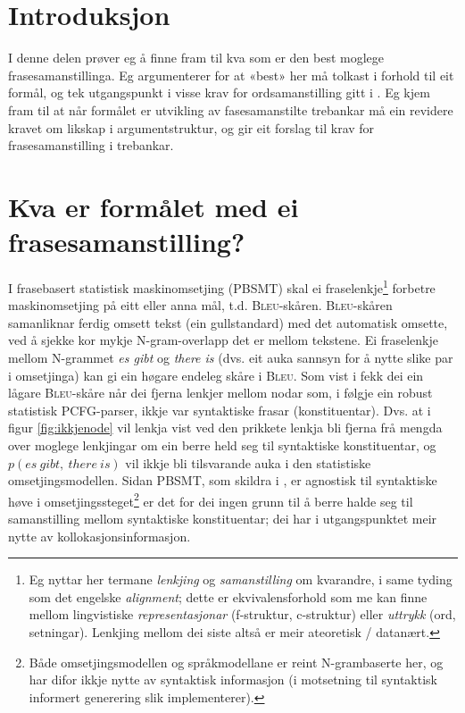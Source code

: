 \documentclass[11pt,a4paper,oneside,draft]{book}
\begin{document}
\section{Introduksjon}
\label{sec-3.2}

I denne delen prøver eg å finne fram til kva som er den best moglege
frasesamanstillinga. Eg argumenterer for at «best» her må tolkast i
forhold til eit formål, og tek utgangspunkt i visse krav for
ordsamanstilling gitt i \citet{thunes2003eal}. Eg kjem fram til at når
formålet er utvikling av fasesamanstilte trebankar må ein revidere
kravet om likskap i argumentstruktur, og gir eit forslag til krav for
frasesamanstilling i trebankar.

\section{Kva er formålet med ei frasesamanstilling?}
\label{sec-3.3}

I frasebasert statistisk maskinomsetjing (PBSMT) skal ei
fraselenkje\footnote{Eg nyttar her termane \emph{lenkjing} og \emph{samanstilling} om
 kvarandre, i same tyding som det engelske \emph{alignment}; dette er
 ekvivalensforhold som me kan finne mellom lingvistiske
 \emph{representasjonar} (f-struktur, c-struktur) eller \emph{uttrykk} (ord,
 setningar). Lenkjing mellom dei siste altså er meir ateoretisk / datanært. } forbetre maskinomsetjing på eitt eller anna mål,
t.d. \textsc{Bleu}-skåren. \textsc{Bleu}-skåren samanliknar ferdig
omsett tekst (ein gullstandard) med det automatisk omsette, ved å
sjekke kor mykje N-gram-overlapp det er mellom tekstene. Ei
fraselenkje mellom N-grammet \emph{es gibt} og \emph{there is} (dvs. eit auka
sannsyn for å nytte slike par i omsetjinga) kan gi ein høgare endeleg
skåre i \textsc{Bleu}. Som vist i \citet{koehn2003spb} fekk dei ein
lågare \textsc{Bleu}-skåre når dei fjerna lenkjer mellom nodar som, i
følgje ein robust statistisk PCFG-parser, ikkje var syntaktiske frasar
(konstituentar). Dvs. at i figur \ref{fig:ikkjenode} vil lenkja vist
ved den prikkete lenkja bli fjerna frå mengda over moglege lenkjingar
om ein berre held seg til syntaktiske konstituentar, og
$p(es~gibt,~there~is)$ vil ikkje bli tilsvarande auka i den
statistiske omsetjingsmodellen. Sidan PBSMT, som skildra i
\citet{koehn2003spb}, er agnostisk til syntaktiske høve i
omsetjingssteget\footnote{Både omsetjingsmodellen og
språkmodellane er reint N-grambaserte her, og har difor ikkje nytte av
syntaktisk informasjon (i motsetning til syntaktisk informert
generering slik \citet{riezler2006gmt} implementerer). } er det for dei ingen grunn til å berre halde
seg til samanstilling mellom syntaktiske konstituentar; dei har i
utgangspunktet meir nytte av kollokasjonsinformasjon.
\end{document}
